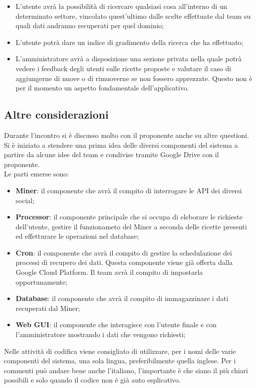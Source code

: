 \begin{itemize}
			\item L'utente avrà la possibilità di ricercare qualsiasi cosa all'interno di un determinato settore, vincolato quest'ultimo dalle scelte effettuate dal team su quali dati andranno recuperati per quel dominio;
			\item L'utente potrà dare un indice di gradimento della ricerca che ha effettuato;
			\item L'amministratore avrà a disposizione una sezione privata nella quale potrà vedere i feedback degli utenti sulle ricette proposte e valutare il caso di aggiungerne di nuove o di rimuoverne se non fossero apprezzate. Questo non è per il momento un aspetto fondamentale dell'applicativo.
		\end{itemize}

	\subsection{Altre considerazioni} %
	\label{sub:altre_considerazioni}
	Durante l'incontro si è discusso molto con il proponente\gloss{} anche su altre questioni. \\
	Si è iniziato a stendere una prima idea delle diversi componenti del sistema a partire da alcune idee del team e condivise tramite Google Drive con il proponente\gloss{}. \\
	Le parti emerse sono:
		\begin{itemize}
			\item \textbf{Miner\gloss{}}: il componente che avrà il compito di interrogare le API\gloss{} dei diversi social;
			\item \textbf{Processor\gloss{}}: il componente principale che si occupa di eleborare le richieste dell'utente, gestire il funzionameto del Miner\gloss{} a seconda delle ricette presenti ed effetturare le operazioni nel database\gloss{};
			\item \textbf{Cron\gloss{}}: il componente che avrà il compito di gestire la schedulazione dei processi di recupero dei dati. Questa componente viene già offerta dalla Google Cloud Platform. Il team avrà il compito di impostarla opportunamente;
			\item \textbf{Database\gloss{}}: il componente che avrà il compito di immagazzinare i dati recuperati dal Miner\gloss{};
			\item \textbf{Web GUI}: il componente che interagisce con l'utente finale e con l'amministratore mostrando i dati che vengono richiesti;
		\end{itemize}
	\noindent
	Nelle attività di codifica viene consigliato di utilizzare, per i nomi delle varie componenti del sistema, una sola lingua, preferibilmente quella inglese. Per i commenti può andare bene anche l'italiano, l'importante è che siano il più chiari possibili e solo quando il codice non è già auto esplicativo. \\

